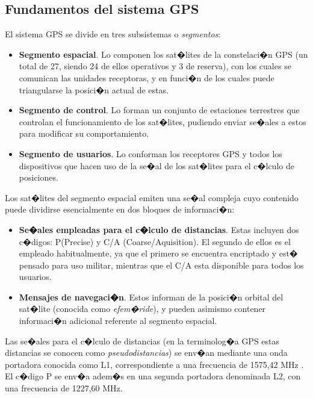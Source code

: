 \subsection{Fundamentos del sistema GPS}

El sistema GPS se divide en tres subsistemas o \emph{segmentos}:

\begin{itemize}
	\item \textbf{Segmento espacial}. Lo componen los sat�lites de la constelaci�n GPS (un total de 27, siendo 24 de ellos operativos y 3 de reserva), con los cuales se comunican las unidades receptoras, y en funci�n de los cuales puede triangularse la posici�n actual de estas.
	\item \textbf{Segmento de control}. Lo forman un conjunto de estaciones terrestres que controlan el funcionamiento de los sat�lites, pudiendo enviar se�ales a estos para modificar su comportamiento.
	\item \textbf{Segmento de usuarios}. Lo conforman los receptores GPS y todos los dispositivos que hacen uso de la se�al de los sat�lites para el c�lculo de posiciones.
\end{itemize}


Los sat�lites del segmento espacial emiten una se�al compleja cuyo contenido puede dividirse esencialmente en dos bloques de informaci�n:

\begin{itemize}
	\item \textbf{Se�ales empleadas para el c�lculo de distancias}. Estas incluyen dos c�digos: P(Precise) y C/A (Coarse/Aquisition). El segundo de ellos es el empleado habitualmente, ya que el primero se encuentra encriptado y est� pensado para uso militar, mientras que el C/A esta disponible para todos los usuarios.
	\item \textbf{Mensajes de navegaci�n}. Estos informan de la posici�n orbital del sat�lite (conocida como \emph{efem�ride}), y pueden asimismo contener informaci�n adicional referente al segmento espacial.
\end{itemize}


Las se�ales para el c�lculo de distancias (en la terminolog�a GPS estas distancias se conocen como \emph{pseudodistancias}) se env�an mediante una onda portadora conocida como L1, correspondiente a una frecuencia de 1575,42 MHz . El c�digo P se env�a adem�s en una segunda portadora denominada L2, con una frecuencia de 1227,60 MHz.

